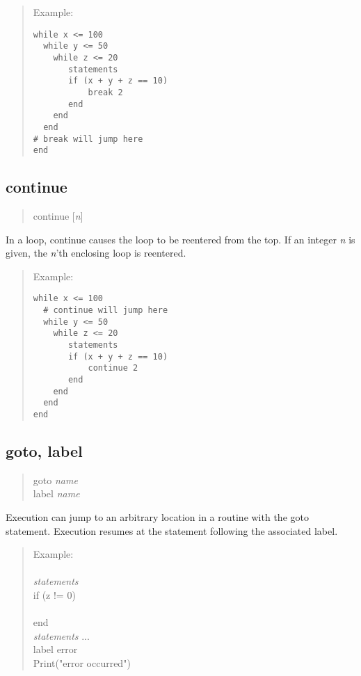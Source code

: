 \begin{quote}
Example:
\begin{verbatim}
while x <= 100
  while y <= 50
    while z <= 20
       statements
       if (x + y + z == 10)
           break 2
       end
    end
  end
# break will jump here
end
\end{verbatim}
\end{quote}

\subsection{\vt continue}

\begin{quote}
{\vt continue} $[${\it n\/}$]$
\end{quote}

In a loop, {\vt continue} causes the loop to be reentered from the top.  If
an integer {\it n\/} is given, the {\it n\/}'th enclosing loop is
reentered. 

\begin{quote}
Example:
\begin{verbatim}
while x <= 100
  # continue will jump here
  while y <= 50
    while z <= 20
       statements
       if (x + y + z == 10)
           continue 2
       end
    end
  end
end
\end{verbatim}
\end{quote}

\subsection{\vt goto, label}

\begin{quote}
{\vt goto} {\it name}\\
{\vt label} {\it name}
\end{quote}

Execution can jump to an arbitrary location in a routine with the {\vt goto}
statement.  Execution resumes at the statement following the
associated {\vt label}.

\begin{quote}
Example:\\
\\
{\it statements}\\
{\vt if (z != 0)}\\
\hspace*{2em}{\vt goto error}\\
{\vt end}\\
{\it statements\/} ...\\
{\vt label error}\\
{\vt Print("error occurred")}
\end{quote}


